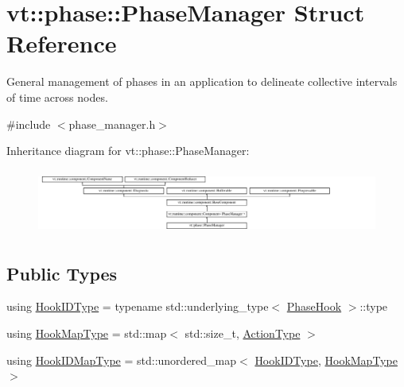 \hypertarget{structvt_1_1phase_1_1_phase_manager}{}\section{vt\+:\+:phase\+:\+:Phase\+Manager Struct Reference}
\label{structvt_1_1phase_1_1_phase_manager}


General management of phases in an application to delineate collective intervals of time across nodes.  




{\ttfamily \#include $<$phase\+\_\+manager.\+h$>$}

Inheritance diagram for vt\+:\+:phase\+:\+:Phase\+Manager\+:\begin{figure}[H]
\begin{center}
\leavevmode
\includegraphics[height=2.167183cm]{structvt_1_1phase_1_1_phase_manager}
\end{center}
\end{figure}
\subsection*{Public Types}
\begin{DoxyCompactItemize}
\item 
using \hyperlink{structvt_1_1phase_1_1_phase_manager_a552ed398953e67cd97c440a7f39a8a6c}{Hook\+I\+D\+Type} = typename std\+::underlying\+\_\+type$<$ \hyperlink{namespacevt_1_1phase_aec9a63fdd99680d7a7fe99d321193811}{Phase\+Hook} $>$\+::type
\item 
using \hyperlink{structvt_1_1phase_1_1_phase_manager_aa8583887716955f4bd4f438bc26141e9}{Hook\+Map\+Type} = std\+::map$<$ std\+::size\+\_\+t, \hyperlink{namespacevt_ae0a5a7b18cc99d7b732cb4d44f46b0f3}{Action\+Type} $>$
\item 
using \hyperlink{structvt_1_1phase_1_1_phase_manager_a7f9784fa7550beaa1e7d59e639169a8b}{Hook\+I\+D\+Map\+Type} = std\+::unordered\+\_\+map$<$ \hyperlink{structvt_1_1phase_1_1_phase_manager_a552ed398953e67cd97c440a7f39a8a6c}{Hook\+I\+D\+Type}, \hyperlink{structvt_1_1phase_1_1_phase_manager_aa8583887716955f4bd4f438bc26141e9}{Hook\+Map\+Type} $>$
\end{DoxyCompactItemize}

